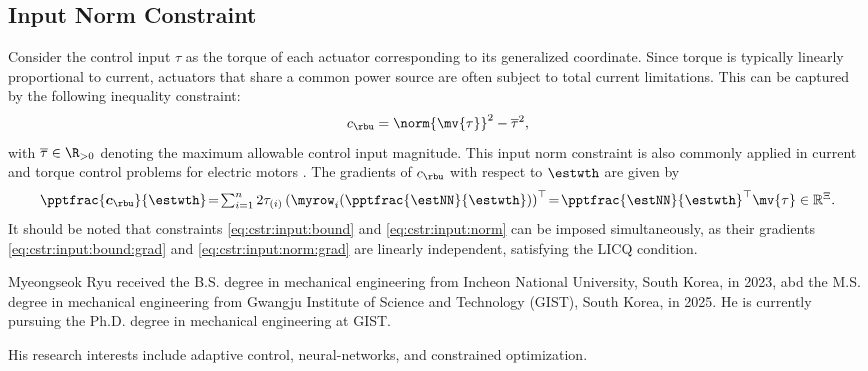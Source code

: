 \documentclass[lettersize,journal]{IEEEtran}
\newcommand*{\template}{template}
\begin{document}
\subsection{Input Norm Constraint}\label{sec:appen:cstr:input:norm}

Consider the control input $\tau$ as the torque of each actuator corresponding to its generalized coordinate. Since torque is typically linearly proportional to current, actuators that share a common power source are often subject to total current limitations. This can be captured by the following inequality constraint: 
\begin{equation}
    c_{\rbu}=\norm{\mv{\tau}}^2 -\overline\tau^2
    ,
    \label{eq:cstr:input:norm}
\end{equation}
with $\overline\tau\in\R_{>0}$ denoting the maximum allowable control input magnitude. This input norm constraint is also commonly applied in current and torque control problems for electric motors \cite{Choi:2024aa}.
The gradients of $c_{\rbu}$ with respect to $\estwth$ are given by
\begin{equation}
    \pptfrac{\boldsymbol c_{\rbu}}{\estwth}
    \!=\! 
    \textstyle\sum_{i=1}^n 2\tau_{(i)} 
    \left(
        \myrow_i
        (
            \pptfrac{\estNN}{\estwth}
        )
    \right)^\top  
    \!=\! 
    {\pptfrac{\estNN}{\estwth}}^\top
    \mv{\tau}
    \in \mathbb R^{\Xi}.
    \label{eq:cstr:input:norm:grad}
\end{equation}
It should be noted that constraints \eqref{eq:cstr:input:bound} and \eqref{eq:cstr:input:norm} can be imposed simultaneously, as their gradients \eqref{eq:cstr:input:bound:grad} and \eqref{eq:cstr:input:norm:grad} are linearly independent, satisfying the LICQ condition.

\printbibliography


\begin{IEEEbiography}{Myeongseok Ryu}
    received the B.S. degree in mechanical engineering from Incheon National University, South Korea, in 2023, abd the M.S. degree in mechanical engineering from Gwangju Institute of Science and Technology (GIST), South Korea, in 2025. 
    He is currently pursuing the Ph.D. degree in mechanical engineering at GIST.

    His research interests include adaptive control, neural-networks, and constrained optimization.
\end{IEEEbiography}
\end{document}
